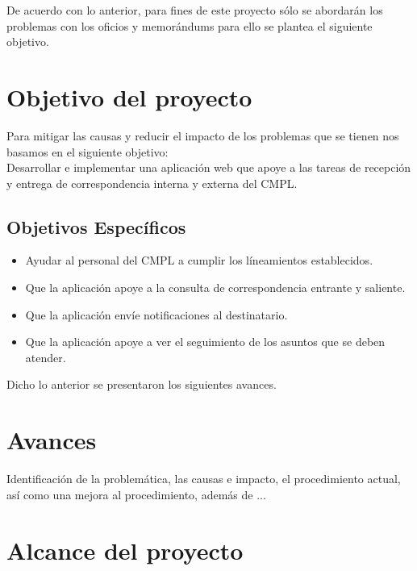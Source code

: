 De acuerdo con lo anterior, para fines de este proyecto sólo se abordarán los problemas con los oficios y memorándums para ello se plantea el siguiente objetivo. \\

\section{Objetivo del proyecto}

Para mitigar las causas y reducir el impacto de los problemas que se tienen nos basamos en el siguiente objetivo: \\

Desarrollar e implementar una aplicación web que apoye a las tareas de recepción y entrega de correspondencia interna y externa del CMPL. \\

\subsection{Objetivos Específicos}

\begin{itemize}
	\item Ayudar al personal del CMPL a cumplir los líneamientos establecidos. %
	\item Que la aplicación apoye a la consulta de correspondencia entrante y saliente.
	\item Que la aplicación envíe notificaciones al destinatario.
	\item Que la aplicación apoye a ver el seguimiento de los asuntos que se deben atender.
\end{itemize}

Dicho lo anterior se presentaron los siguientes avances. 

\section{Avances}
Identificación de la problemática, las causas e impacto, el procedimiento actual, así como una mejora al procedimiento, además de ...

\section{Alcance del proyecto}


